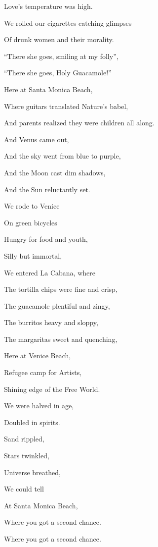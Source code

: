 \documentclass{article}
\begin{document}
Love's temperature was high.

We rolled our cigarettes catching glimpses 

Of drunk women and their morality.

``There she goes, smiling at my folly'',

``There she goes, Holy Guacamole!''

Here at Santa Monica Beach,

Where guitars translated Nature's babel,

And parents realized they were children all along.

\newline \newline

And Venus came out,

And the sky went from blue to purple,

And the Moon cast dim shadows,

And the Sun reluctantly set.

We rode to Venice

On green bicycles

Hungry for food and youth,

Silly but immortal,

We entered La Cabana, where

The tortilla chips were fine and crisp,

The guacamole plentiful and zingy,

The burritos heavy and sloppy,

The margaritas sweet and quenching,

Here at Venice Beach,

Refugee camp for Artists,

Shining edge of the Free World.

\newline \newline

We were halved in age,

Doubled in spirits.

Sand rippled,

Stars twinkled,

Universe breathed,

We could tell

At Santa Monica Beach,

Where you got a second chance.

Where you got a second chance.
\end{document}
